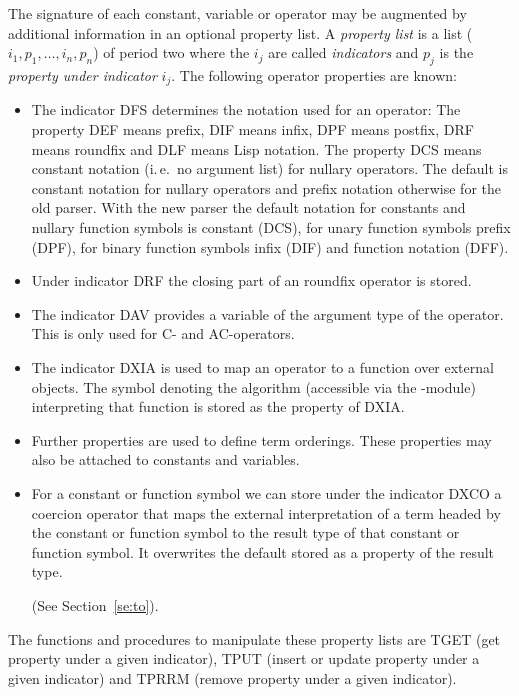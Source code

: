 The signature of each constant,  variable or operator may be augmented by
additional information in an optional property list.
A {\em property list} is a list ($i_1, p_1, \ldots, i_n, p_n$) of period two
where the $i_j$ are called {\em indicators} and $p_j$ is the 
{\em property under indicator} $i_j$.
The following operator properties are known:
\begin{itemize}
 \item The indicator DFS determines the notation used for an operator:
       The property DEF means prefix, DIF means infix, DPF means
       postfix, DRF means roundfix and DLF means Lisp notation.
       The property DCS means constant notation (i.\,e.\ no argument list)
       for nullary operators.
       The default is constant notation for nullary operators and
       prefix notation otherwise for the old parser.
       With the new parser the default notation for constants and nullary
       function symbols is constant (DCS), for unary function symbols
       prefix (DPF), for binary function symbols infix (DIF) and
       function notation (DFF).
 \item Under indicator DRF the closing part of an roundfix operator is
       stored.
 \item The indicator DAV provides a variable of the argument type of the
       operator. This is only used for C- and AC-operators.
 \item The indicator DXIA is used to map an operator to a function
       over external objects. The symbol denoting the algorithm  (accessible
       via the {\it}-module) interpreting
       that function is stored as the property of DXIA.
 \item Further properties are used to define term orderings.
       These properties may also be attached to constants and variables.
 \item For a constant or function symbol we can store
       under the indicator DXCO a coercion operator 
       that maps the external interpretation of a term headed by the
       constant or function symbol to the result type of that constant or
       function symbol.
       It overwrites the default stored as a property of the result type.

       (See Section~\ref{se:to}).
\end{itemize}
The functions and procedures to manipulate these property lists are TGET 
(get property under a given indicator), 
TPUT (insert or update property under a given indicator) and 
TPRRM (remove property under a given indicator).


